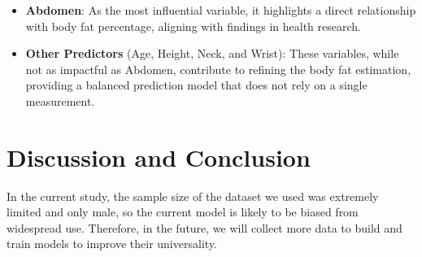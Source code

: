 \documentclass[8pt,twocolumn,twoside]{pnas-new}
\begin{document}
\begin{itemize}
    \item \textbf{Abdomen}: As the most influential variable, it highlights a direct relationship with body fat percentage, aligning with findings in health research.
    \item \textbf{Other Predictors} (Age, Height, Neck, and Wrist): These variables, while not as impactful as Abdomen, contribute to refining the body fat estimation, providing a balanced prediction model that does not rely on a single measurement.
\end{itemize}
\section*{Discussion and Conclusion}
In the current study, the sample size of the dataset we used was extremely limited and only male, so the current model is likely to be biased from widespread use. Therefore, in the future, we will collect more data to build and train models to improve their universality.
\end{document}
